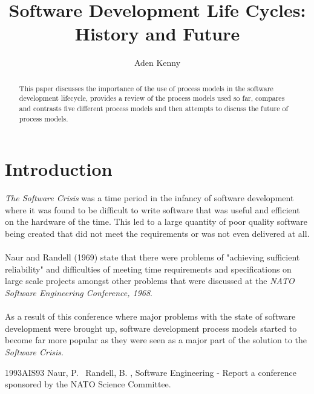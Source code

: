 \documentclass{CRPITStyle}
\begin{document}
	\title {Software Development Life Cycles: History and Future}
	\author {Aden Kenny}
	\maketitle


	\begin {abstract} 
		This paper discusses the importance of the use of process models in the software development lifecycle, provides a
		review of the process models used so far, compares and contrasts five different process models and then attempts to
		discuss the future of process models.
	\end {abstract}

	
	\section {Introduction} 
		\textit{The Software Crisis} was a time period in the infancy of software development where it was found to be difficult 
		to write software that was useful and efficient on the hardware of the time. This led to a large quantity of poor quality
		software being created that did not meet the requirements or was not even delivered at all.\\
		~\\
		Naur and Randell (1969) state that there were problems of "achieving sufficient reliability" and difficulties of meeting time
		requirements and specifications on large scale projects amongst other problems that were discussed at the \textit{NATO
		Software Engineering Conference, 1968}.\\
		~\\
		As a result of this conference where major problems with the state of software development were brought up, software
		development process models started to become far more popular as they were seen as a major part of the solution to the
		\textit{Software Crisis}.
	
	   

\begin{thebibliography}{xx}

  	{1993}{AIS93}
	Naur, P. \harvardand\ Randell, B.  \harvardyearright , Software Engineering - Report a conference sponsored by the NATO Science Committee.


\end{thebibliography}
		
\end{document}

